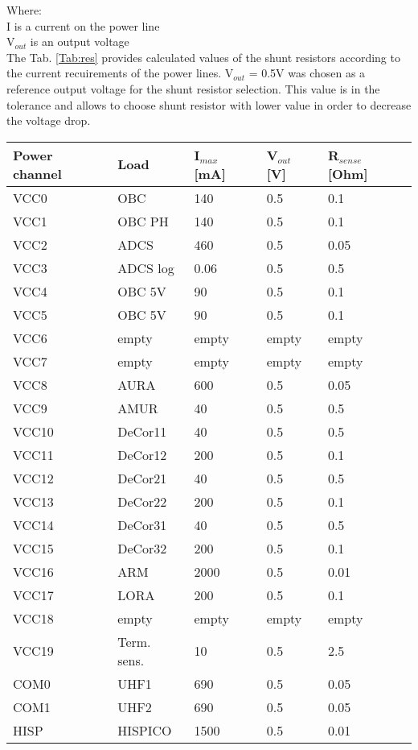   Where:\\
  I is a current on the power line\\
  V$_{out}$ is an output voltage\\ 
 
 The Tab. \ref{Tab:res} provides calculated values of the shunt resistors according to the current recuirements of the power lines. V$_{out}$ = 0.5V was chosen as a reference output voltage for the shunt resistor selection. This value is in the tolerance and allows to choose shunt resistor with lower value in order to decrease the voltage drop.
  \newpage
  
   \begin{tabular}{p{3cm}p{3cm}p{2cm}p{2cm}p{3cm}} \toprule
   	Power channel & Load & I$_{max}$ [mA] & V$_{out}$ [V] & R$_{sense}$ [Ohm]\\ \midrule
   VCC0 & OBC & 140 & 0.5 & 0.1\\
   VCC1 & OBC PH & 140 & 0.5 & 0.1\\
   VCC2 & ADCS & 460 & 0.5 & 0.05\\
   VCC3 & ADCS log & 0.06 & 0.5 & 0.5\\
   VCC4 & OBC 5V & 90 & 0.5 & 0.1\\
   VCC5 & OBC 5V & 90 & 0.5 & 0.1\\
   VCC6 & empty & empty & empty & empty\\
   VCC7 & empty & empty & empty & empty\\
   VCC8 & AURA & 600 & 0.5 & 0.05\\
   VCC9 & AMUR & 40 & 0.5 & 0.5\\
   VCC10 & DeCor11 & 40 & 0.5 & 0.5\\
   VCC11 & DeCor12 & 200 & 0.5 & 0.1\\ 
   VCC12 & DeCor21 & 40 & 0.5 & 0.5\\ 
   VCC13 & DeCor22 & 200 & 0.5 & 0.1\\ 
   VCC14 & DeCor31 & 40 & 0.5 & 0.5\\ 
   VCC15 & DeCor32 & 200 & 0.5 & 0.1\\ 
   VCC16 & ARM & 2000 & 0.5 & 0.01\\
   VCC17 & LORA & 200 &  0.5 & 0.1\\
   VCC18 & empty & empty & empty & empty\\
   VCC19 & Term. sens. & 10 & 0.5 & 2.5\\
   COM0 & UHF1 & 690 & 0.5 & 0.05\\
   COM1 & UHF2 & 690 & 0.5 & 0.05\\
   	HISP & HISPICO & 1500 & 0.5& 0.01\\ 
    \bottomrule
   	
   \end{tabular}\\ \\ \\ \\

